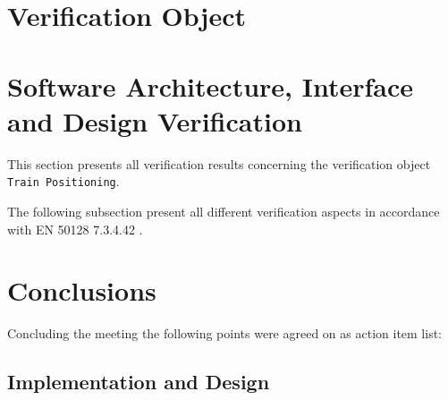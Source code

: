 \documentclass{article}
\newcommand{\nl}{\mbox{}\\}
\newcommand{\bgcmmnt}[1]{\nl\framebox{\parbox{.95\textwidth}{#1}}\nl[2mm]}
\begin{document}
\section{Verification Object}




\section{Software Architecture, Interface and Design Verification}

This section presents all verification results concerning the verification object \texttt{Train Positioning}. 

\begin{comment}
\bgcmmnt{For all verification aspects addressed in the following section the following 3 points shall be state clearly:
\begin{enumerate}
\item Responsible verifier
\item Use verification strategy and technique (with reference to the V\&V Plan)
\item Verification results (level of conformity, detected errors or deficiencies and made assumptions)
\end{enumerate}
\end{comment}

The following subsection present all different verification aspects in accordance with EN 50128 7.3.4.42 \cite{EN50128}.









\section{Conclusions}
Concluding the meeting the following points were agreed on as action item list:

\subsection{Implementation and Design}
\end{document}
